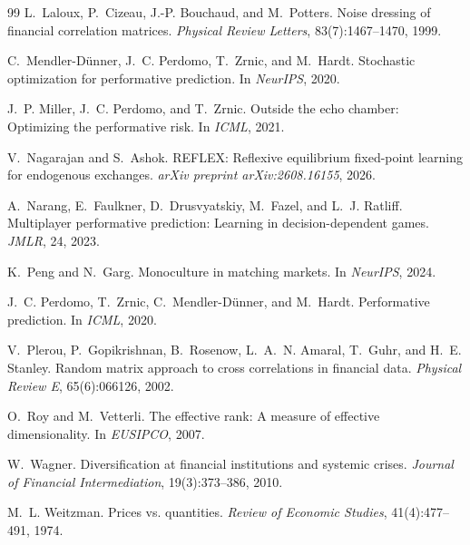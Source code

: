 \documentclass{article}
\theoremstyle{plain}
\theoremstyle{definition}
\begin{document}
\begin{thebibliography}{99}
 L.~Laloux, P.~Cizeau, J.-P. Bouchaud, and M.~Potters. Noise dressing of financial correlation matrices. \emph{Physical Review Letters}, 83(7):1467--1470, 1999.

 C.~Mendler-D\"unner, J.~C. Perdomo, T.~Zrnic, and M.~Hardt. Stochastic optimization for performative prediction. In \emph{NeurIPS}, 2020.

 J.~P. Miller, J.~C. Perdomo, and T.~Zrnic. Outside the echo chamber: Optimizing the performative risk. In \emph{ICML}, 2021.

 V.~Nagarajan and S.~Ashok. REFLEX: Reflexive equilibrium fixed-point learning for endogenous exchanges. \emph{arXiv preprint arXiv:2608.16155}, 2026.

 A.~Narang, E.~Faulkner, D.~Drusvyatskiy, M.~Fazel, and L.~J. Ratliff. Multiplayer performative prediction: Learning in decision-dependent games. \emph{JMLR}, 24, 2023.

 K.~Peng and N.~Garg. Monoculture in matching markets. In \emph{NeurIPS}, 2024.

 J.~C. Perdomo, T.~Zrnic, C.~Mendler-D\"unner, and M.~Hardt. Performative prediction. In \emph{ICML}, 2020.

 V.~Plerou, P.~Gopikrishnan, B.~Rosenow, L.~A.~N. Amaral, T.~Guhr, and H.~E. Stanley. Random matrix approach to cross correlations in financial data. \emph{Physical Review E}, 65(6):066126, 2002.

 O.~Roy and M.~Vetterli. The effective rank: A measure of effective dimensionality. In \emph{EUSIPCO}, 2007.

 W.~Wagner. Diversification at financial institutions and systemic crises. \emph{Journal of Financial Intermediation}, 19(3):373--386, 2010.

 M.~L. Weitzman. Prices vs. quantities. \emph{Review of Economic Studies}, 41(4):477--491, 1974.

\end{thebibliography}

\appendix



\newpage

\end{document}
